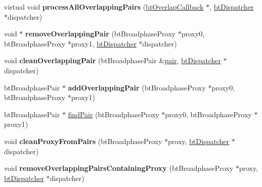 \begin{DoxyCompactItemize}
\item 
\hypertarget{classbt_sorted_overlapping_pair_cache_a0d53253e9ec500d3e1982e7631a2ddd2}{virtual void {\bfseries process\+All\+Overlapping\+Pairs} (\hyperlink{structbt_overlap_callback}{bt\+Overlap\+Callback} $\ast$, \hyperlink{classbt_dispatcher}{bt\+Dispatcher} $\ast$dispatcher)}\label{classbt_sorted_overlapping_pair_cache_a0d53253e9ec500d3e1982e7631a2ddd2}

\item 
\hypertarget{classbt_sorted_overlapping_pair_cache_aac784674692808a8f7a7282e7c136850}{void $\ast$ {\bfseries remove\+Overlapping\+Pair} (bt\+Broadphase\+Proxy $\ast$proxy0, bt\+Broadphase\+Proxy $\ast$proxy1, \hyperlink{classbt_dispatcher}{bt\+Dispatcher} $\ast$dispatcher)}\label{classbt_sorted_overlapping_pair_cache_aac784674692808a8f7a7282e7c136850}

\item 
\hypertarget{classbt_sorted_overlapping_pair_cache_a93515a9a3bc255484af4024b802bee0d}{void {\bfseries clean\+Overlapping\+Pair} (bt\+Broadphase\+Pair \&\hyperlink{structpair}{pair}, \hyperlink{classbt_dispatcher}{bt\+Dispatcher} $\ast$dispatcher)}\label{classbt_sorted_overlapping_pair_cache_a93515a9a3bc255484af4024b802bee0d}

\item 
\hypertarget{classbt_sorted_overlapping_pair_cache_a3de8d574d45d3a589dadd1024a7f1484}{bt\+Broadphase\+Pair $\ast$ {\bfseries add\+Overlapping\+Pair} (bt\+Broadphase\+Proxy $\ast$proxy0, bt\+Broadphase\+Proxy $\ast$proxy1)}\label{classbt_sorted_overlapping_pair_cache_a3de8d574d45d3a589dadd1024a7f1484}

\item 
bt\+Broadphase\+Pair $\ast$ \hyperlink{classbt_sorted_overlapping_pair_cache_a73b6665ffd9874f0575b72d07761ce8d}{find\+Pair} (bt\+Broadphase\+Proxy $\ast$proxy0, bt\+Broadphase\+Proxy $\ast$proxy1)
\item 
\hypertarget{classbt_sorted_overlapping_pair_cache_acf542ec63da3047a2e9e04cb03d6bfe8}{void {\bfseries clean\+Proxy\+From\+Pairs} (bt\+Broadphase\+Proxy $\ast$proxy, \hyperlink{classbt_dispatcher}{bt\+Dispatcher} $\ast$dispatcher)}\label{classbt_sorted_overlapping_pair_cache_acf542ec63da3047a2e9e04cb03d6bfe8}

\item 
\hypertarget{classbt_sorted_overlapping_pair_cache_a77a9dc74c2250b05524b6c20d969bb68}{void {\bfseries remove\+Overlapping\+Pairs\+Containing\+Proxy} (bt\+Broadphase\+Proxy $\ast$proxy, \hyperlink{classbt_dispatcher}{bt\+Dispatcher} $\ast$dispatcher)}\label{classbt_sorted_overlapping_pair_cache_a77a9dc74c2250b05524b6c20d969bb68}


\end{DoxyCompactItemize}
